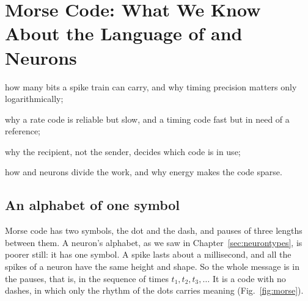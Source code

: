 \chapter{Morse Code: What We Know About the Language of  and  Neurons}
\label{sec:code}
\begin{chaptergoals}
\item how many bits a spike train can carry, and why timing precision matters only logarithmically;
\item why a rate code is reliable but slow, and a timing code fast but in need of a reference;
\item why the recipient, not the sender, decides which code is in use;
\item how  and  neurons divide the work, and why energy makes the code sparse.
\end{chaptergoals}

\section{An alphabet of one symbol}

Morse code has two symbols, the dot and the dash, and pauses of three lengths between them. A neuron's alphabet, as we saw in Chapter~\ref{sec:neurontypes}, is poorer still: it has one symbol. A spike lasts about a millisecond, and all the spikes of a neuron have the same height and shape. So the whole message is in the pauses, that is, in the sequence of times $t_1,t_2,t_3,\dots$ It is a code with no dashes, in which only the rhythm of the dots carries meaning (Fig.~\ref{fig:morse}).

